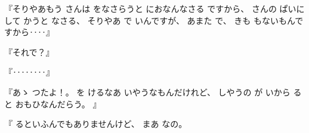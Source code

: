 
%
『そりやあもう
さんは
をなさらうと
におなんなさる
ですから、
%
さんの
ぱいに
して
かうと
なさる、
%
そりやあ
で
いんですが、
%
あまた
で、
%
きも
もないもんですから‥‥』

%
『それで？』

%
『‥‥‥‥』

%
『あゝ
つたよ！。
%
を
けるなあ
いやうなもんだけれど、
%
しやうの
が
いから
ると
おもひなんだらう。
』

%
『
るといふんでもありませんけど、
%
まあ
なの。

